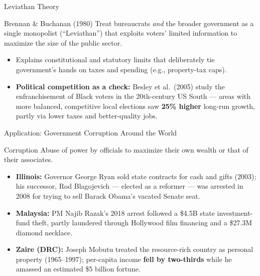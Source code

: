 \documentclass[11pt,aspectratio=169]{beamer}
\begin{document}
\begin{frame}{Leviathan Theory}
  \begin{block}{Brennan \& Buchanan (1980)}
    Treat bureaucrats \emph{and} the broader government as a single monopolist (``Leviathan'') that exploits voters' limited information to maximize the size of the public sector.
  \end{block}
  \begin{itemize}
    \item Explains constitutional and statutory limits that deliberately tie government's hands on taxes and spending (e.g., property-tax caps).
    \item \textbf{Political competition as a check:} Besley et al.\ (2005) study the enfranchisement of Black voters in the 20th-century US South --- areas with more balanced, competitive local elections saw \textbf{25\% higher} long-run growth, partly via lower taxes and better-quality jobs.
  \end{itemize}
\end{frame}

\begin{frame}{Application: Government Corruption Around the World}
  \begin{block}{Corruption}
    Abuse of power by officials to maximize their own wealth or that of their associates.
  \end{block}
  \begin{itemize}
    \item \textbf{Illinois:} Governor George Ryan sold state contracts for cash and gifts (2003); his successor, Rod Blagojevich --- elected as a reformer --- was arrested in 2008 for trying to sell Barack Obama's vacated Senate seat.
    \item \textbf{Malaysia:} PM Najib Razak's 2018 arrest followed a \$4.5B state investment-fund theft, partly laundered through Hollywood film financing and a \$27.3M diamond necklace.
    \item \textbf{Zaire (DRC):} Joseph Mobutu treated the resource-rich country as personal property (1965--1997); per-capita income \textbf{fell by two-thirds} while he amassed an estimated \$5 billion fortune.
  \end{itemize}
\end{frame}
\end{document}
